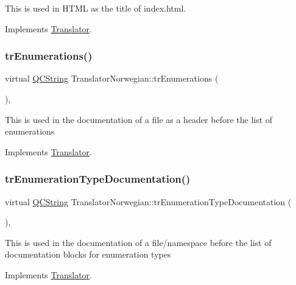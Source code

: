 This is used in H\+T\+ML as the title of index.\+html. 

Implements \mbox{\hyperlink{class_translator}{Translator}}.

\mbox{\label{class_translator_norwegian_a6609a383fdb0f2ef8b09391179278228}} 
\subsubsection{\texorpdfstring{trEnumerations()}{trEnumerations()}}
{\footnotesize\ttfamily virtual \mbox{\hyperlink{class_q_c_string}{Q\+C\+String}} Translator\+Norwegian\+::tr\+Enumerations (\begin{DoxyParamCaption}{ }\end{DoxyParamCaption})\hspace{0.3cm}{\ttfamily [inline]}, {\ttfamily [virtual]}}

This is used in the documentation of a file as a header before the list of enumerations 

Implements \mbox{\hyperlink{class_translator}{Translator}}.

\mbox{\label{class_translator_norwegian_a62cf7f9780edc2581dbf3c73697bfca6}} 
\subsubsection{\texorpdfstring{trEnumerationTypeDocumentation()}{trEnumerationTypeDocumentation()}}
{\footnotesize\ttfamily virtual \mbox{\hyperlink{class_q_c_string}{Q\+C\+String}} Translator\+Norwegian\+::tr\+Enumeration\+Type\+Documentation (\begin{DoxyParamCaption}{ }\end{DoxyParamCaption})\hspace{0.3cm}{\ttfamily [inline]}, {\ttfamily [virtual]}}

This is used in the documentation of a file/namespace before the list of documentation blocks for enumeration types 

Implements \mbox{\hyperlink{class_translator}{Translator}}.

